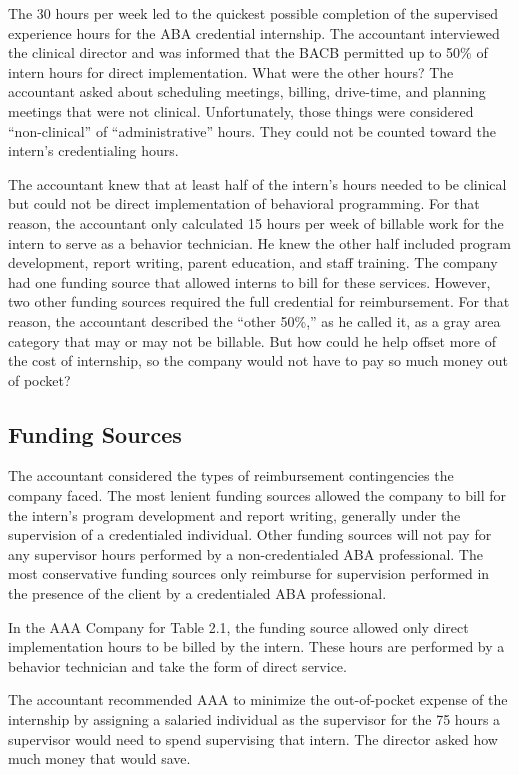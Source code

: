The 30 hours per week led to the quickest possible completion of the supervised experience hours for the ABA credential internship. The accountant interviewed the clinical director and was informed that the BACB\textregistered{} permitted up to 50\% of intern hours for direct implementation. What were the other hours? The accountant asked about scheduling meetings, billing, drive-time, and planning meetings that were not clinical. Unfortunately, those things were considered ``non-clinical'' of ``administrative'' hours. They could not be counted toward the intern's credentialing hours.

The accountant knew that at least half of the intern's hours needed to be clinical but could not be direct implementation of behavioral programming. For that reason, the accountant only calculated 15 hours per week of billable work for the intern to serve as a behavior technician. He knew the other half included program development, report writing, parent education, and staff training. The company had one funding source that allowed interns to bill for these services. However, two other funding sources required the full credential for reimbursement. For that reason, the accountant described the ``other 50\%,'' as he called it, as a gray area category that may or may not be billable. But how could he help offset more of the cost of internship, so the company would not have to pay so much money out of pocket?

\subsection{Funding Sources}
The accountant considered the types of reimbursement contingencies the company faced. The most lenient funding sources allowed the company to bill for the intern's program development and report writing, generally under the supervision of a credentialed individual. Other funding sources will not pay for any supervisor hours performed by a non-credentialed ABA professional. The most conservative funding sources only reimburse for supervision performed in the presence of the client by a credentialed ABA professional. 

In the AAA Company for Table 2.1, the funding source allowed only direct implementation hours to be billed by the intern. These hours are performed by a behavior technician and take the form of direct service.

The accountant recommended AAA to minimize the out-of-pocket expense of the internship by assigning a salaried individual as the supervisor for the 75 hours a supervisor would need to spend supervising that intern.  The director asked how much money that would save. 

